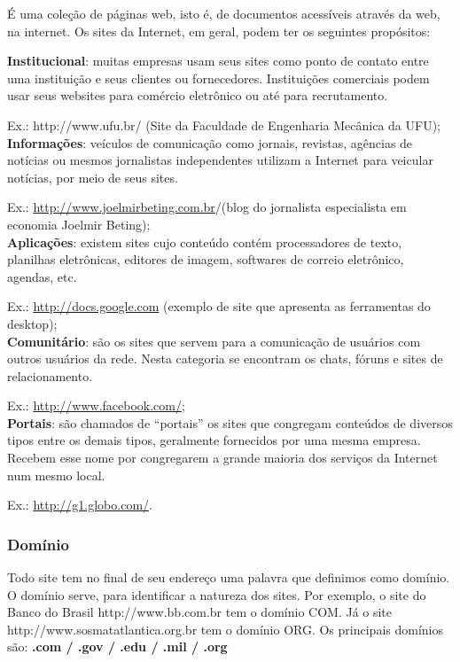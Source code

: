 \documentclass[hidelinks,12pt]{article}
\begin{document}
É uma coleção de páginas web, isto é, de documentos acessíveis através da web, na internet. Os sites da Internet, em geral, podem ter os seguintes propósitos:

\textbf{Institucional}: muitas empresas usam seus sites como ponto de contato entre uma instituição e seus clientes ou fornecedores. Instituições comerciais podem usar seus websites para comércio eletrônico ou até para recrutamento.

Ex.: http://www.ufu.br/ (Site da Faculdade de Engenharia Mecânica da UFU);\\


\textbf{Informações}: veículos de comunicação como jornais, revistas, agências de notícias ou mesmos jornalistas independentes utilizam a Internet para veicular notícias, por meio de seus sites.

Ex.: \url{http://www.joelmirbeting.com.br}/(blog do jornalista especialista em economia Joelmir Beting);\\


\textbf{Aplicações}: existem sites cujo conteúdo contém processadores de texto, planilhas eletrônicas, editores de imagem, softwares de correio eletrônico, agendas, etc.

Ex.: \url{http://docs.google.com} (exemplo de site que apresenta as ferramentas do desktop);\\


\textbf{Comunitário}: são os sites que servem para a comunicação de usuários com outros usuários da rede. Nesta categoria se encontram os chats, fóruns e sites de relacionamento.

Ex.: \url{http://www.facebook.com/};\\


\textbf{Portais}: são chamados de ``portais'' os sites que congregam conteúdos de diversos tipos entre os demais tipos, geralmente fornecidos por uma mesma empresa. Recebem esse nome por congregarem a grande maioria dos serviços da Internet num mesmo local.

Ex.: \url{http://g1.globo.com/}.\\


\subsubsection{Domínio}

Todo site tem no final de seu endereço uma palavra que definimos como domínio. O domínio serve, para identificar a natureza dos sites. Por exemplo, o site do Banco do Brasil http://www.bb.com.br tem o domínio COM. Já o site http://www.sosmatatlantica.org.br tem o domínio ORG. Os principais domínios são: \textbf{.com / .gov / .edu / .mil / .org}\\
\end{document}
